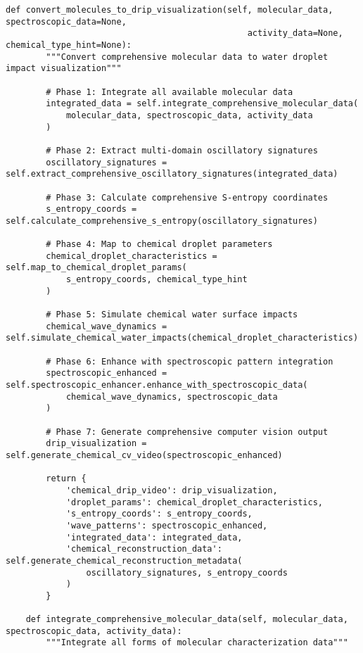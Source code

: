 \documentclass[12pt,a4paper]{article}
\begin{document}
\begin{algorithm}
\begin{algorithmic}[1]
\begin{lstlisting}[style=pythonstyle, caption=Core Molecule-to-Drip Implementation for Comprehensive Chemical Analysis]
    def convert_molecules_to_drip_visualization(self, molecular_data, spectroscopic_data=None, 
                                                activity_data=None, chemical_type_hint=None):
        """Convert comprehensive molecular data to water droplet impact visualization"""
        
        # Phase 1: Integrate all available molecular data
        integrated_data = self.integrate_comprehensive_molecular_data(
            molecular_data, spectroscopic_data, activity_data
        )
        
        # Phase 2: Extract multi-domain oscillatory signatures
        oscillatory_signatures = self.extract_comprehensive_oscillatory_signatures(integrated_data)
        
        # Phase 3: Calculate comprehensive S-entropy coordinates
        s_entropy_coords = self.calculate_comprehensive_s_entropy(oscillatory_signatures)
        
        # Phase 4: Map to chemical droplet parameters
        chemical_droplet_characteristics = self.map_to_chemical_droplet_params(
            s_entropy_coords, chemical_type_hint
        )
        
        # Phase 5: Simulate chemical water surface impacts
        chemical_wave_dynamics = self.simulate_chemical_water_impacts(chemical_droplet_characteristics)
        
        # Phase 6: Enhance with spectroscopic pattern integration
        spectroscopic_enhanced = self.spectroscopic_enhancer.enhance_with_spectroscopic_data(
            chemical_wave_dynamics, spectroscopic_data
        )
        
        # Phase 7: Generate comprehensive computer vision output
        drip_visualization = self.generate_chemical_cv_video(spectroscopic_enhanced)
        
        return {
            'chemical_drip_video': drip_visualization,
            'droplet_params': chemical_droplet_characteristics,
            's_entropy_coords': s_entropy_coords,
            'wave_patterns': spectroscopic_enhanced,
            'integrated_data': integrated_data,
            'chemical_reconstruction_data': self.generate_chemical_reconstruction_metadata(
                oscillatory_signatures, s_entropy_coords
            )
        }
    
    def integrate_comprehensive_molecular_data(self, molecular_data, spectroscopic_data, activity_data):
        """Integrate all forms of molecular characterization data"""
        

\end{lstlisting}
\end{algorithmic}
\end{algorithm}
\end{document}
